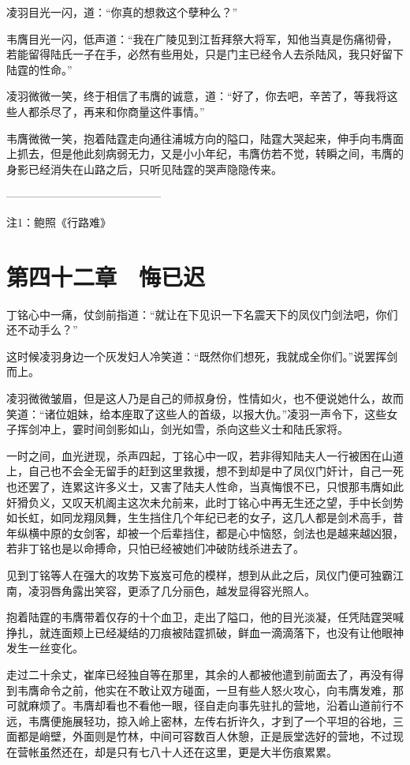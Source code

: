 凌羽目光一闪，道：“你真的想救这个孽种么？”

韦膺目光一闪，低声道：“我在广陵见到江哲拜祭大将军，知他当真是伤痛彻骨，若能留得陆氏一子在手，必然有些用处，只是门主已经令人去杀陆风，我只好留下陆霆的性命。”

凌羽微微一笑，终于相信了韦膺的诚意，道：“好了，你去吧，辛苦了，等我将这些人都杀尽了，再来和你商量这件事情。”

韦膺微微一笑，抱着陆霆走向通往浦城方向的隘口，陆霆大哭起来，伸手向韦膺面上抓去，但是他此刻病弱无力，又是小小年纪，韦膺仿若不觉，转瞬之间，韦膺的身影已经消失在山路之后，只听见陆霆的哭声隐隐传来。

——————————————

注1：鲍照《行路难》

\chapter{第四十二章　悔已迟}

丁铭心中一痛，仗剑前指道：“就让在下见识一下名震天下的凤仪门剑法吧，你们还不动手么？”

这时候凌羽身边一个灰发妇人冷笑道：“既然你们想死，我就成全你们。”说罢挥剑而上。

凌羽微微皱眉，但是这人乃是自己的师叔身份，性情如火，也不便说她什么，故而笑道：“诸位姐妹，给本座取了这些人的首级，以报大仇。”凌羽一声令下，这些女子挥剑冲上，霎时间剑影如山，剑光如雪，杀向这些义士和陆氏家将。

一时之间，血光迸现，杀声四起，丁铭心中一叹，若非得知陆夫人一行被困在山道上，自己也不会全无留手的赶到这里救援，想不到却是中了凤仪门奸计，自己一死也还罢了，连累这许多义士，又害了陆夫人性命，当真悔恨不已，只恨那韦膺如此奸猾负义，又叹天机阁主这次未允前来，此时丁铭心中再无生还之望，手中长剑势如长虹，如同龙翔凤舞，生生挡住几个年纪已老的女子，这几人都是剑术高手，昔年纵横中原的女剑客，却被一个后辈挡住，都是心中恼怒，剑法也是越来越凶狠，若非丁铭也是以命搏命，只怕已经被她们冲破防线杀进去了。

见到丁铭等人在强大的攻势下岌岌可危的模样，想到从此之后，凤仪门便可独霸江南，凌羽唇角露出笑容，更添了几分丽色，越发显得容光照人。

抱着陆霆的韦膺带着仅存的十个血卫，走出了隘口，他的目光淡凝，任凭陆霆哭喊挣扎，就连面颊上已经凝结的刀痕被陆霆抓破，鲜血一滴滴落下，也没有让他眼神发生一丝变化。

走过二十余丈，崔庠已经独自等在那里，其余的人都被他遣到前面去了，再没有得到韦膺命令之前，他实在不敢让双方碰面，一旦有些人怒火攻心，向韦膺发难，那可就麻烦了。韦膺却看也不看他一眼，径自走向事先驻扎的营地，沿着山道前行不远，韦膺便施展轻功，掠入岭上密林，左传右折许久，才到了一个平坦的谷地，三面都是峭壁，外面则是竹林，中间可容数百人休憩，正是辰堂选好的营地，不过现在营帐虽然还在，却是只有七八十人还在这里，更是大半伤痕累累。

